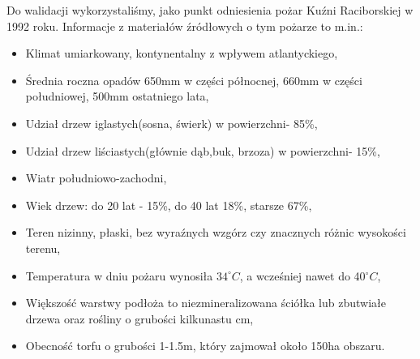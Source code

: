 \documentclass[a4paper, 11pt]{article}
\begin{document}
	Do walidacji wykorzystaliśmy, jako punkt odniesienia pożar Kuźni Raciborskiej w 1992 roku.
	Informacje z materiałów źródłowych o tym pożarze to m.in.:
	\begin{itemize}
	\item Klimat umiarkowany, kontynentalny z wpływem atlantyckiego,
	\item Średnia roczna opadów 650mm w części północnej, 660mm w części południowej, 500mm ostatniego lata,
	\item Udział drzew iglastych(sosna, świerk) w powierzchni- 85\%,
	\item Udział drzew liściastych(głównie dąb,buk, brzoza) w powierzchni- 15\%,
	\item Wiatr południowo-zachodni,
	\item Wiek drzew: do 20 lat - 15\%, do 40 lat 18\%, starsze 67\%,
	\item Teren nizinny, płaski, bez wyraźnych wzgórz czy znacznych różnic wysokości terenu,
	\item Temperatura w dniu pożaru wynosiła $34^\circ C$, a wcześniej nawet do 40$^\circ C$,
	\item Większość warstwy podłoża to niezmineralizowana ściółka lub zbutwiałe drzewa oraz rośliny o grubości kilkunastu cm,
	\item Obecność torfu o grubości 1-1.5m, który zajmował około 150ha obszaru.
	\end{itemize}
\end{document}
